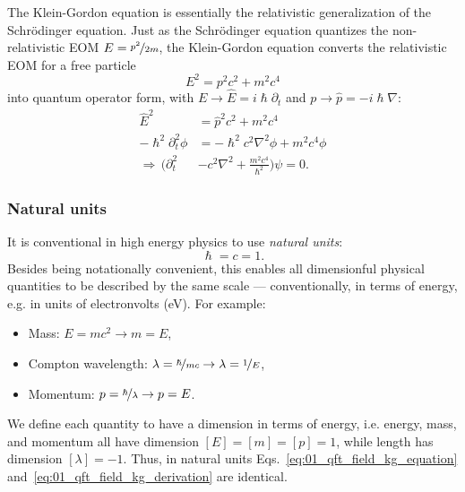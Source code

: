 The Klein-Gordon equation is essentially the relativistic generalization of the Schrödinger equation.
Just as the Schrödinger equation quantizes the non-relativistic EOM $E = \cnicefrac{p^2}{2m}$, the Klein-Gordon equation converts the relativistic EOM for a free particle
\begin{equation}
	\label{eq:01_qft_field_relativistic_eom}
	E^2 = p^2c^2 + m^2c^4
\end{equation}
into quantum operator form, with $E \rightarrow \hat{E} = i\hslash\partial_t$ and $p \rightarrow \hat p =  -i\hslash\nabla$:
\begin{equation}
	\label{eq:01_qft_field_kg_derivation}
	\begin{split}
		\hat E^2 &= \hat p^2c^2 + m^2c^4 \\
		-\hslash^2\partial_t^2\phi &= -\hslash^2c^2\nabla^2\phi + m^2c^4\phi \\
		\Rightarrow \, (\partial_t^2 &- c^2\nabla^2 + \frac{m^2c^4}{\hslash^2})\psi = 0.
	\end{split}
\end{equation}

\subsubsection{Natural units}

It is conventional in high energy physics to use \textit{natural units}:
\begin{equation}
	\label{eq:01_qft_field_natural_units}
	\hslash = c = 1.
\end{equation}
Besides being notationally convenient, this enables all dimensionful physical quantities to be described by the same scale --- conventionally, in terms of energy, e.g. in units of electronvolts (eV).
For example:
\begin{itemize}
	\item Mass: $E = mc^2 \rightarrow m = E$,
	\item Compton wavelength: $\lambda = \cnicefrac{\hslash}{mc} \rightarrow \lambda = \cnicefrac{1}{E}$,
	\item Momentum: $p = \cnicefrac{\hbar}{\lambda} \rightarrow p = E$.
\end{itemize}
We define each quantity to have a dimension in terms of energy, i.e. energy, mass, and momentum all have dimension $[E] = [m] = [p] = 1$, while length has dimension $[\lambda] = -1$.
Thus, in natural units Eqs.~\ref{eq:01_qft_field_kg_equation} and~\ref{eq:01_qft_field_kg_derivation} are identical.

